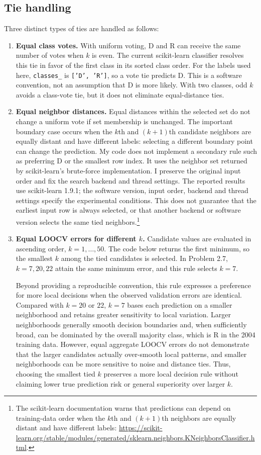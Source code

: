 \documentclass[11pt,a4paper]{article}
\begin{document}
\subsection*{Tie handling}
Three distinct types of ties are handled as follows:
\begin{enumerate}
\item \textbf{Equal class votes.} With uniform voting, D and R can receive the same number of votes when $k$ is even. The current scikit-learn classifier resolves this tie in favor of the first class in its sorted class order. For the labels used here, \texttt{classes\_} is \texttt{['D', 'R']}, so a vote tie predicts D. This is a software convention, not an assumption that D is more likely. With two classes, odd $k$ avoids a class-vote tie, but it does not eliminate equal-distance ties.

\item \textbf{Equal neighbor distances.} Equal distances within the selected set do not change a uniform vote if set membership is unchanged. The important boundary case occurs when the $k$th and $(k+1)$th candidate neighbors are equally distant and have different labels: selecting a different boundary point can change the prediction. My code does not implement a secondary rule such as preferring D or the smallest row index. It uses the neighbor set returned by scikit-learn's brute-force implementation. I preserve the original input order and fix the search backend and thread settings. The reported results use scikit-learn 1.9.1; the software version, input order, backend and thread settings specify the experimental conditions. This does not guarantee that the earliest input row is always selected, or that another backend or software version selects the same tied neighbors.\footnote{The scikit-learn documentation warns that predictions can depend on training-data order when the $k$th and $(k+1)$th neighbors are equally distant and have different labels: \url{https://scikit-learn.org/stable/modules/generated/sklearn.neighbors.KNeighborsClassifier.html}.}

\item \textbf{Equal LOOCV errors for different $k$.} Candidate values are evaluated in ascending order, $k=1,\ldots,50$. The code below returns the first minimum, so the smallest $k$ among the tied candidates is selected. In Problem 2.7, $k=7,20,22$ attain the same minimum error, and this rule selects $k=7$.

Beyond providing a reproducible convention, this rule expresses a preference for more local decisions when the observed validation errors are identical. Compared with $k=20$ or $22$, $k=7$ bases each prediction on a smaller neighborhood and retains greater sensitivity to local variation. Larger neighborhoods generally smooth decision boundaries and, when sufficiently broad, can be dominated by the overall majority class, which is R in the 2004 training data. However, equal aggregate LOOCV errors do not demonstrate that the larger candidates actually over-smooth local patterns, and smaller neighborhoods can be more sensitive to noise and distance ties. Thus, choosing the smallest tied $k$ preserves a more local decision rule without claiming lower true prediction risk or general superiority over larger $k$.


\end{enumerate}
\end{document}

